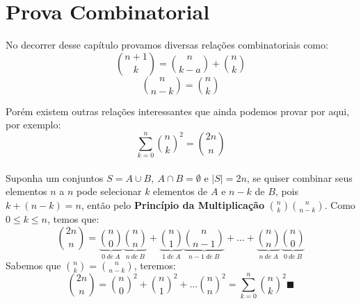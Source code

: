 \documentclass[main.tex]{subfiles}
\begin{document}
\section{Prova Combinatorial}
No decorrer desse capítulo provamos diversas relações combinatoriais como:
$$ {n+1 \choose k} = {n \choose k-a} + {n \choose k}$$
$${n \choose n-k} = {n \choose k}$$

Porém existem outras relações interessantes que ainda podemos provar por aqui, por exemplo:
$$\sum_{k = 0}^{n} {n \choose k}^2 = {2n \choose n}$$
\\
Suponha um conjuntos $S = A \cup B, \ A \cap B = \emptyset$ e $|S| = 2n$, se quiser combinar seus elementos $n$ a $n$ pode selecionar $k$ elementos de $A$ e $n-k$ de $B$, pois $k+(n-k) = n$, então pelo \textbf{Princípio da Multiplicação} ${n \choose k}{n \choose n-k}$. Como $0 \leq k \leq n$, temos que:
$${2n \choose n} = \underbrace{n \choose 0}_{0 \ de \ A}\underbrace{n \choose n}_{n \ de \ B} + \underbrace{n \choose 1}_{1 \ de \ A}\underbrace{n \choose n-1}_{n-1 \ de \ B} + \dots + \underbrace{n \choose n}_{n \ de \ A}\underbrace{n \choose 0}_{0 \ de \ B}$$
Sabemos que ${n \choose k} = {n \choose n-k}$, teremos:
$${2n \choose n} = {n \choose 0}^2 + {n \choose 1}^2 + \dots {n \choose n}^2 = \sum_{k = 0}^{n} {n \choose k}^2 \blacksquare$$
\end{document}
